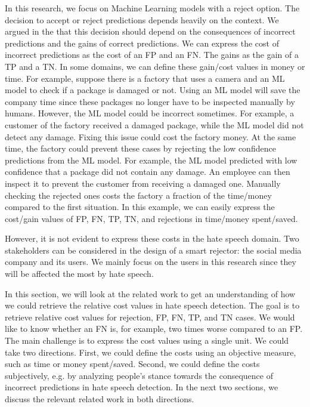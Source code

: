 In this research, we focus on Machine Learning models with a reject option. The decision to accept or reject predictions depends heavily on the context. We argued in the  that this decision should depend on the consequences of incorrect predictions and the gains of correct predictions. We can express the cost of incorrect predictions as the cost of an FP and an FN. The gains as the gain of a TP and a TN. In some domains, we can define these gain/cost values in money or time. For example, suppose there is a factory that uses a camera and an ML model to check if a package is damaged or not. Using an ML model will save the company time since these packages no longer have to be inspected manually by humans. However, the ML model could be incorrect sometimes. For example, a customer of the factory received a damaged package, while the ML model did not detect any damage. Fixing this issue could cost the factory money. At the same time, the factory could prevent these cases by rejecting the low confidence predictions from the ML model. For example, the ML model predicted with low confidence that a package did not contain any damage. An employee can then inspect it to prevent the customer from receiving a damaged one. Manually checking the rejected ones costs the factory a fraction of the time/money compared to the first situation. In this example, we can easily express the cost/gain values of FP, FN, TP, TN, and rejections in time/money spent/saved.

However, it is not evident to express these costs in the hate speech domain. Two stakeholders can be considered in the design of a smart rejector: the social media company and its users. We mainly focus on the users in this research since they will be affected the most by hate speech.

In this section, we will look at the related work to get an understanding of how we could retrieve the relative cost values in hate speech detection. The goal is to retrieve relative cost values for rejection, FP, FN, TP, and TN cases. We would like to know whether an FN is, for example, two times worse compared to an FP. The main challenge is to express the cost values using a single unit. We could take two directions. First, we could define the costs using an objective measure, such as time or money spent/saved. Second, we could define the costs subjectively, e.g. by analyzing people's stance towards the consequence of incorrect predictions in hate speech detection. In the next two sections, we discuss the relevant related work in both directions.


